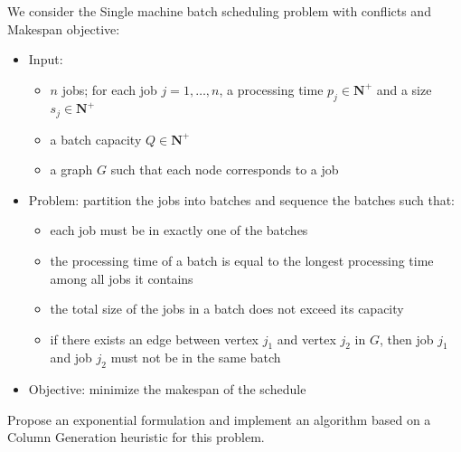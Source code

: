 \documentclass[a4paper,twocolumn]{article}
\newcommand{\N}{\mathbf{N}}
\begin{document}
We consider the Single machine batch scheduling problem with conflicts and Makespan objective:
\begin{itemize}
  \item Input:
    \begin{itemize}
      \item $n$ jobs; for each job $j = 1, \dots, n$, a processing time $p_j \in \N^+$ and a size $s_j \in \N^+$
      \item a batch capacity $Q \in \N^+$
      \item a graph $G$ such that each node corresponds to a job
    \end{itemize}
  \item Problem: partition the jobs into batches and sequence the batches such that:
    \begin{itemize}
      \item each job must be in exactly one of the batches
      \item the processing time of a batch is equal to the longest processing time among all jobs it contains
      \item the total size of the jobs in a batch does not exceed its capacity
      \item if there exists an edge between vertex $j_1$ and vertex $j_2$ in $G$, then job $j_1$ and job $j_2$ must not be in the same batch
    \end{itemize}
  \item Objective: minimize the makespan of the schedule
\end{itemize}

Propose an exponential formulation and implement an algorithm based on a Column Generation heuristic for this problem.
\end{document}
